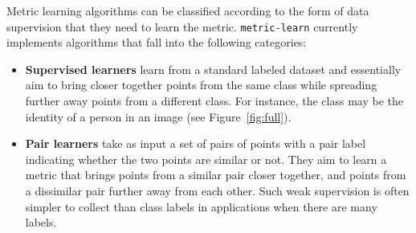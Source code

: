 \documentclass[twoside,11pt]{article}
\begin{document}
Metric learning algorithms can be classified according to the form of data supervision that they need to learn the metric. \texttt{metric-learn} currently implements algorithms that fall into the following categories:
\begin{itemize}
\item \textbf{Supervised learners} learn from a standard labeled dataset and essentially aim to bring closer together points from the same class while spreading further away points from a different class. For instance, the class may be the identity of a person in an image (see Figure~\ref{fig:full}). 
\item \textbf{Pair learners} take as input a set of pairs of points with a pair label indicating whether the two points are similar or not. They aim to learn a metric that brings points from a similar pair closer together, and points from a dissimilar pair further away from each other. Such weak supervision is often simpler to collect than class labels in applications when there are many labels. %

\end{itemize}
\end{document}
